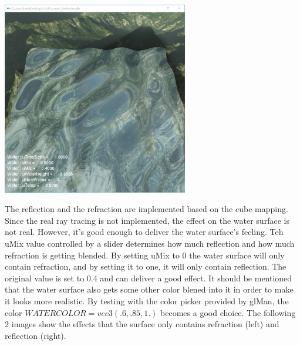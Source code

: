 \documentclass[letterpaper,14pt,titlepage,fleqn]{article}
\begin{document}
\begin{center}
	\includegraphics[width=3.2in]{wave3.jpg}
\end{center}
The reflection and the refraction are implemented based on the cube mapping. Since the real ray tracing is not implemented, the effect on the water surface is not real. However, it's good enough to deliver the water surface's feeling. Teh uMix value controlled by a slider determines how much reflection and how much refraction is getting blended. By setting uMix to 0 the water surface will only contain refraction, and by setting it to one, it will only contain reflection. The original value is set to 0.4 and can deliver a good effect. It should be mentioned that the water surface also gets some other color blened into it in order to make it looks more realistic. By testing with the color picker provided by glMan, the color $WATERCOLOR = vec3( .6, .85, 1. )$ becomes a good choice. The following 2 images show the effects that the surface only contains refraction (left) and reflection (right). 
\end{document}
